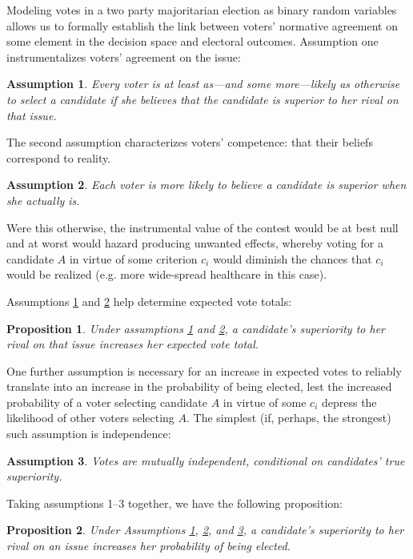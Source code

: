 \documentclass[11pt]{article}
\newtheorem{prop}{Proposition}
\newtheorem{ass}{Assumption}
\begin{document}
Modeling votes in a two party majoritarian election as
binary random variables allows us to formally establish the link between voters' normative agreement on some element in the decision space and electoral outcomes.
Assumption one instrumentalizes voters' agreement on the issue:
\begin{ass}\label{ass:preference}
Every voter is at least as---and some more---likely as otherwise to select a candidate if she believes  that the candidate is superior to her rival on that issue.
\end{ass}
The second assumption characterizes voters' competence: that their beliefs correspond to reality.
\begin{ass}\label{ass:belief}%
Each voter is more likely to believe a candidate is
          superior when she actually is.
\end{ass}
Were this otherwise, the instrumental value of the contest would be at best null and at worst would hazard producing unwanted effects, whereby voting for a candidate $A$ in virtue of some criterion $c_i$ would diminish the chances that $c_i$ would be realized (e.g. more wide-spread healthcare in this case).

Assumptions \ref{ass:preference} and \ref{ass:belief} help determine expected vote totals:
\begin{prop}\label{prop:voteTotal}
Under assumptions \ref{ass:preference} and \ref{ass:belief},
a candidate's superiority to her rival on that issue increases her expected vote total.
\end{prop}
One further assumption  is necessary for an increase in expected votes to reliably translate into
an increase in the probability of being elected, lest the increased probability of a voter selecting candidate $A$ in virtue of some $c_i$ depress the likelihood of other voters selecting $A$.
The simplest (if, perhaps, the strongest) such assumption is independence:
\begin{ass}\label{ass:independent}
Votes are mutually independent, conditional on candidates' true superiority.
\end{ass}
Taking assumptions 1--3 together, we have the following proposition:
\begin{prop}
Under Assumptions \ref{ass:preference}, \ref{ass:belief}, and \ref{ass:independent},
a candidate's superiority to her rival on an issue increases her probability of being elected.
\end{prop}
\end{document}
